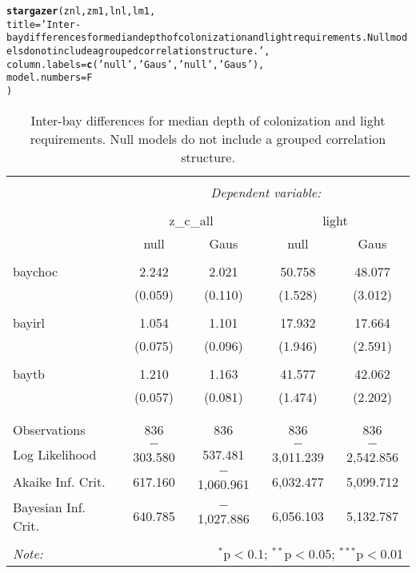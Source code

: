 \documentclass{article}\usepackage[]{graphicx}\usepackage[]{color}
\makeatletter
\newcommand{\hlstr}[1]{\textcolor[rgb]{0.192,0.494,0.8}{#1}}%
\newcommand{\hlstd}[1]{\textcolor[rgb]{0.345,0.345,0.345}{#1}}%
\newcommand{\hlkwc}[1]{\textcolor[rgb]{0.333,0.667,0.333}{#1}}%
\newcommand{\hlkwd}[1]{\textcolor[rgb]{0.737,0.353,0.396}{\textbf{#1}}}%
\newenvironment{kframe}{%
 \def\at@end@of@kframe{}%
 \ifinner\ifhmode%
  \def\at@end@of@kframe{\end{minipage}}%
  \begin{minipage}{\columnwidth}%
 \fi\fi%
 \def\FrameCommand##1{\hskip\@totalleftmargin \hskip-\fboxsep
 \colorbox{shadecolor}{##1}\hskip-\fboxsep
     \hskip-\linewidth \hskip-\@totalleftmargin \hskip\columnwidth}%
 \MakeFramed {\advance\hsize-\width
   \@totalleftmargin\z@ \linewidth\hsize
   \@setminipage}}%
 {\par\unskip\endMakeFramed%
 \at@end@of@kframe}
\makeatother
\begin{document}
\begin{kframe}
\begin{alltt}
\hlkwd{stargazer}\hlstd{(znl, zm1, lnl, lm1,}
  \hlkwc{title} \hlstd{=} \hlstr{'Inter-bay differences for median depth of colonization and light requirements. Null models do not include a grouped correlation structure.'}\hlstd{,}
  \hlkwc{column.labels} \hlstd{=} \hlkwd{c}\hlstd{(}\hlstr{'null'}\hlstd{,} \hlstr{'Gaus'}\hlstd{,} \hlstr{'null'}\hlstd{,} \hlstr{'Gaus'}\hlstd{),}
  \hlkwc{model.numbers} \hlstd{= F}
  \hlstd{)}
\end{alltt}
\end{kframe}
\begin{table}[!htbp] \centering 
  \caption{Inter-bay differences for median depth of colonization and light requirements. Null models do not include a grouped correlation structure.} 
  \label{} 
\begin{tabular}{@{\extracolsep{5pt}}lcccc} 
\\[-1.8ex]\hline 
\hline \\[-1.8ex] 
 & \multicolumn{4}{c}{\textit{Dependent variable:}} \\ 
\cline{2-5} 
\\[-1.8ex] & \multicolumn{2}{c}{z\_c\_all} & \multicolumn{2}{c}{light} \\ 
 & null & Gaus & null & Gaus \\ 
\hline \\[-1.8ex] 
 baychoc & 2.242 & 2.021 & 50.758 & 48.077 \\ 
  & (0.059) & (0.110) & (1.528) & (3.012) \\ 
  & & & & \\ 
 bayirl & 1.054 & 1.101 & 17.932 & 17.664 \\ 
  & (0.075) & (0.096) & (1.946) & (2.591) \\ 
  & & & & \\ 
 baytb & 1.210 & 1.163 & 41.577 & 42.062 \\ 
  & (0.057) & (0.081) & (1.474) & (2.202) \\ 
  & & & & \\ 
\hline \\[-1.8ex] 
Observations & 836 & 836 & 836 & 836 \\ 
Log Likelihood & $-$303.580 & 537.481 & $-$3,011.239 & $-$2,542.856 \\ 
Akaike Inf. Crit. & 617.160 & $-$1,060.961 & 6,032.477 & 5,099.712 \\ 
Bayesian Inf. Crit. & 640.785 & $-$1,027.886 & 6,056.103 & 5,132.787 \\ 
\hline 
\hline \\[-1.8ex] 
\textit{Note:}  & \multicolumn{4}{r}{$^{*}$p$<$0.1; $^{**}$p$<$0.05; $^{***}$p$<$0.01} \\ 
\end{tabular} 
\end{table} 
\end{document}
